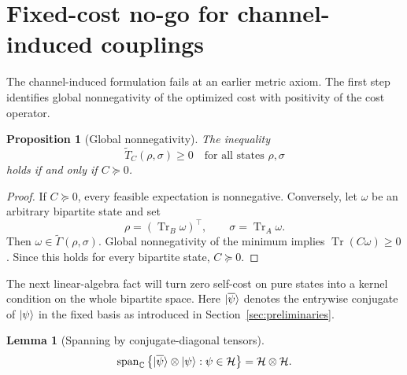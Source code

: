 \documentclass[11pt]{article}
\newtheorem{lemma}[theorem]{Lemma}
\newtheorem{proposition}[theorem]{Proposition}
\DeclarePairedDelimiter\ket{\lvert}{\rangle}
\newcommand{\calH}{\mathcal{H}}
\begin{document}
\section{Fixed-cost no-go for channel-induced couplings}
\label{sec:channel-induced-no-go}

The channel-induced formulation fails at an earlier metric axiom.  The
first step identifies global nonnegativity of the optimized cost with
positivity of the cost operator.

\begin{proposition}[Global nonnegativity]\label{prop:channel-global-positivity}
    The inequality
    \[
        \widetilde T_C(\rho,\sigma)\geq0
        \quad\text{for all states }\rho,\sigma
    \]
    holds if and only if $C\succeq0$.
\end{proposition}

\begin{proof}
    If $C\succeq0$, every feasible expectation is nonnegative.  Conversely,
    let $\omega$ be an arbitrary bipartite state and set
    \[
        \rho=(\operatorname{Tr}_B\omega)^{\top},
        \qquad
        \sigma=\operatorname{Tr}_A\omega.
    \]
    Then $\omega\in\widetilde\Gamma(\rho,\sigma)$.  Global nonnegativity of
    the minimum implies $\operatorname{Tr}(C\omega)\geq0$.  Since this holds
    for every bipartite state, $C\succeq0$.
\end{proof}

The next linear-algebra fact will turn zero self-cost on pure states into a
kernel condition on the whole bipartite space.  Here
$\ket{\overline\psi}$ denotes the entrywise conjugate of $\ket\psi$ in the
fixed basis as introduced in Section~\ref{sec:preliminaries}.

\begin{lemma}[Spanning by conjugate-diagonal tensors]
\label{lem:conjugate-diagonal-spanning}
    \begin{equation}\label{eq:conjugate-diagonal-spanning}
        \operatorname{span}_{\mathbb{C}}
        \left\{\ket{\overline\psi}\otimes\ket\psi:
        \psi\in\calH\right\}
        =\calH\otimes\calH.
    \end{equation}
\end{lemma}
\end{document}
